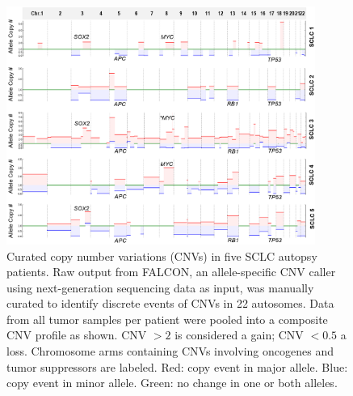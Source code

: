 \begin{figure}[p]
    \centering
    \includegraphics[width=0.9\textwidth,keepaspectratio]{images/sclc/curated_cnv_plots}
    \caption[Curated CNVs in SCLC autopsy patients.]{Curated copy number variations (CNVs) in five SCLC autopsy patients. Raw output from FALCON, an allele-specific CNV caller using next-generation sequencing data as input, was manually curated to identify discrete events of CNVs in 22 autosomes. Data from all tumor samples per patient were pooled into a composite CNV profile as shown. CNV $>2$ is considered a gain; CNV $<0.5$ a loss. Chromosome arms containing CNVs involving oncogenes and tumor suppressors are labeled. Red: copy event in major allele. Blue: copy event in minor allele. Green: no change in one or both alleles.}
    \label{fig:sclc:curated_cnv_plots}
\end{figure}

